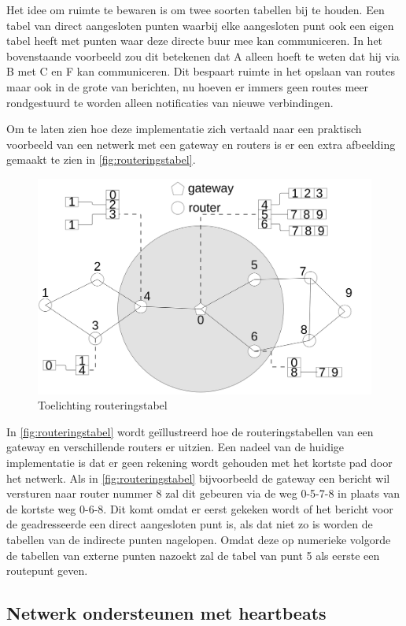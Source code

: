 \documentclass[a4paper, 11pt, oneside]{report}
\begin{document}
Het idee om ruimte te bewaren is om twee soorten tabellen bij te houden. Een tabel van direct aangesloten punten waarbij elke aangesloten punt ook een eigen tabel heeft met punten waar deze directe buur mee kan communiceren. In het bovenstaande voorbeeld zou dit betekenen dat A alleen hoeft te weten dat hij via B met C en F kan communiceren. Dit bespaart ruimte in het opslaan van routes maar ook in de grote van berichten, nu hoeven er immers geen routes meer rondgestuurd te worden alleen notificaties van nieuwe verbindingen.

Om te laten zien hoe deze implementatie zich vertaald naar een praktisch voorbeeld van een netwerk met een gateway en routers is er een extra afbeelding gemaakt te zien in \autoref{fig:routeringstabel}.

\begin{figure}[H]
	\begin{center}\includegraphics[width=0.6\linewidth]{Afbeeldingen/uitlegtabel.png}\end{center}
	\caption{Toelichting routeringstabel}
	\label{fig:routeringstabel}
\end{figure}

In \autoref{fig:routeringstabel} wordt geïllustreerd hoe de routeringstabellen van een gateway en verschillende routers er uitzien.
Een nadeel van de huidige implementatie is dat er geen rekening wordt gehouden met het kortste pad door het netwerk.
Als in \autoref{fig:routeringstabel} bijvoorbeeld de gateway een bericht wil versturen naar router nummer 8 zal dit gebeuren via de weg 0-5-7-8 in plaats van de kortste weg 0-6-8. Dit komt omdat er eerst gekeken wordt of het bericht voor de geadresseerde een direct aangesloten punt is, als dat niet zo is worden de tabellen van de indirecte punten nagelopen. Omdat deze op numerieke volgorde de tabellen van externe punten nazoekt zal de tabel van punt 5 als eerste een routepunt geven.

\subsection{Netwerk ondersteunen met heartbeats}
\end{document}
